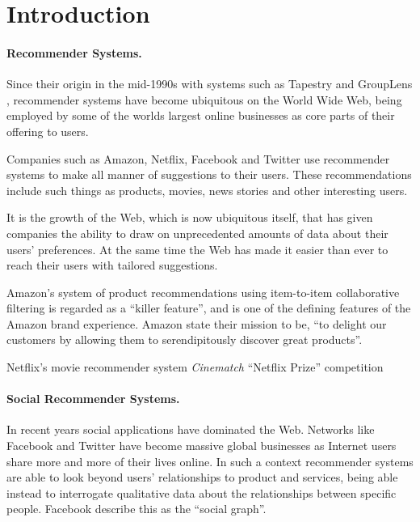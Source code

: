 \iffalse 
Chapter 1: Introduction - the topic, the background, why the topic is relevant or of interest to you, what you hoped to achieve, the aims and objectives of the project.  
\fi

\section{Introduction}

\paragraph{Recommender Systems.}

Since their origin in the mid-1990s with systems such as Tapestry \cite{Goldberg92} and GroupLens \cite{Resnick94}, recommender systems have become ubiquitous on the World Wide Web, being employed by some of the worlds largest online businesses as core parts of their offering to users.

Companies such as Amazon, Netflix, Facebook and Twitter use recommender systems to make all manner of suggestions to their users. These recommendations include such things as products, movies, news stories and other interesting users. 

It is the growth of the Web, which is now ubiquitous itself, that has given companies the ability to draw on unprecedented amounts of data about their users' preferences. At the same time the Web has made it easier than ever to reach their users with tailored suggestions.

Amazon's system of product recommendations using item-to-item collaborative filtering is regarded as a ``killer feature''\cite{Fortune12}, and is one of the defining features of the Amazon brand experience. Amazon state their mission to be, ``to delight our customers by allowing them to serendipitously discover great products''\cite{Fortune12}.

Netflix's movie recommender system \emph{Cinematch}  ``Netflix Prize'' competition 


\paragraph{Social Recommender Systems.}

In recent years social applications have dominated the Web. Networks like Facebook and Twitter have become massive global businesses as Internet users share more and more of their lives online. In such a context recommender systems are able to look beyond users' relationships to product and services, being able instead to interrogate qualitative data about the relationships between specific people. Facebook describe this as the ``social graph''.

